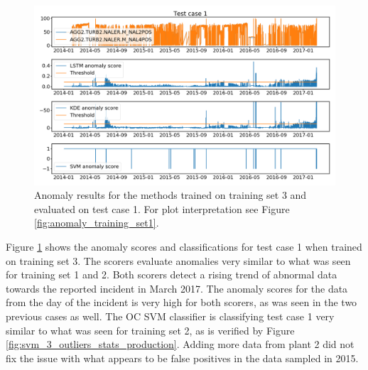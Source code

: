         \begin{figure}[h!]
            \centering
            \includegraphics[width=\textwidth]{report/figures/analysis/plant2_train_long/production_data_anomaly.png}
            \caption{Anomaly results for the methods trained on training set 3 and evaluated on test case 1. For plot interpretation see Figure \ref{fig:anomaly_training_set1}.}
            \label{fig:plant2_lomg_prod_anomaly_score}
        \end{figure}
        Figure \ref{fig:plant2_lomg_prod_anomaly_score} shows the anomaly scores and classifications for test case 1 when trained on training set 3. The scorers evaluate anomalies very similar to what was seen for training set 1 and 2. Both scorers detect a rising trend of abnormal data towards the reported incident in March 2017. The anomaly scores for the data from the day of the incident is very high for both scorers, as was seen in the two previous cases as well. The OC SVM classifier is classifying test case 1 very similar to what was seen for training set 2, as is verified by Figure \ref{fig:svm_3_outliers_stats_production}. Adding more data from plant 2 did not fix the issue with what appears to be false positives in the data sampled in 2015. 
        
